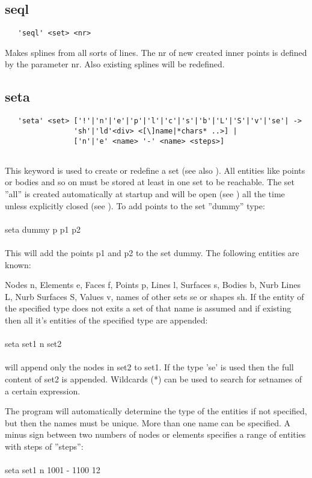\documentclass{article}
\begin{document}
\subsection{\label{seql}seql}
\begin{verbatim}
   'seql' <set> <nr>
\end{verbatim}
Makes splines from all sorts of lines. The nr of new created inner points is defined by the parameter nr. Also existing splines will be redefined.

\subsection{\label{seta}seta}
\begin{verbatim}
   'seta' <set> ['!'|'n'|'e'|'p'|'l'|'c'|'s'|'b'|'L'|'S'|'v'|'se'| ->
                'sh'|'ld'<div> <[\]name|*chars* ..>] |
                ['n'|'e' <name> '-' <name> <steps>]
                
\end{verbatim}
This keyword is used to create or redefine a set (see also ). All entities like points or bodies and so on must be stored at least in one set to be reachable. The set ''all'' is created automatically at startup and will be open (see ) all the time unless explicitly closed (see ). To add points to the set ''dummy'' type:\\\\seta dummy p p1 p2\\\\This will add the points p1 and p2 to the set dummy. The following entities are known:

Nodes n, Elements e, Faces f, Points p, Lines l, Surfaces s, Bodies b, Nurb Lines L, Nurb Surfaces S, Values v, names of other sets se or shapes sh. If the entity of the specified type does not exits a set of that name is assumed and if existing then all it's entities of the specified type are appended:\\\\seta set1 n set2\\\\will append only the nodes in set2 to set1. If the type 'se' is used then the full content of set2 is appended. Wildcards (*) can be used to search for setnames of a certain expression.

The program will automatically determine the type of the entities if not specified, but then the names must be unique. More than one name can be specified. A minus sign between two numbers of nodes or elements specifies a range of entities with steps of ''steps'':\\\\seta set1 n 1001 - 1100 12\\\\
\end{document}
